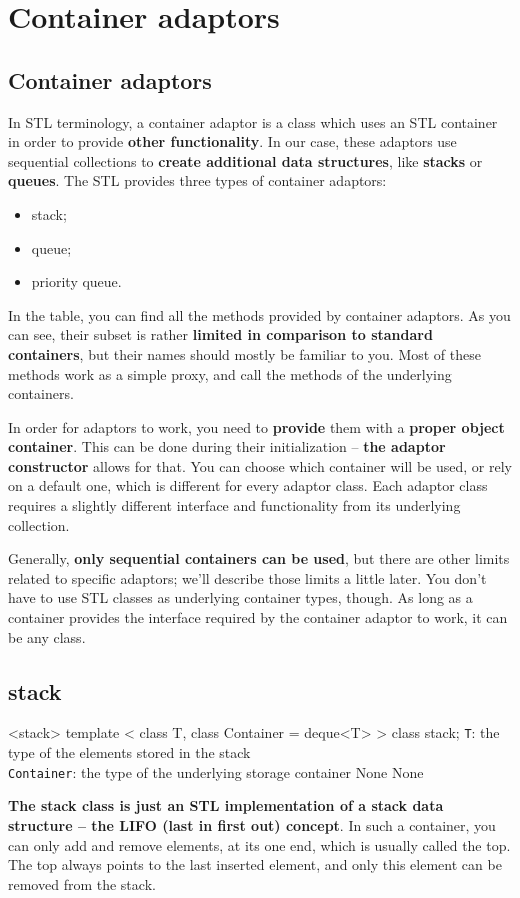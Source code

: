 %
%
\section{Container adaptors} %
\subsection{Container adaptors} %
In STL terminology, a container adaptor is a class which uses an STL container in order to provide 
\textbf{other functionality}. In our case, these adaptors use sequential collections to \textbf{create 
additional data structures}, like \textbf{stacks} or \textbf{queues}. The STL provides three types of container 
adaptors:
\begin{itemize}
    \item stack;
    \item queue;
    \item priority queue.
\end{itemize}
In the table, you can find all the methods provided by container adaptors. As you can see, their subset is 
rather \textbf{limited in comparison to standard containers}, but their names should mostly be familiar to you. 
Most of these methods work as a simple proxy, and call the methods of the underlying containers.

In order for adaptors to work, you need to \textbf{provide} them with a \textbf{proper object container}. 
This can be done during their initialization – \textbf{the adaptor constructor} allows for that. You can 
choose which container will be used, or rely on a default one, which is different for every adaptor class. 
Each adaptor class requires a slightly different interface and functionality from its underlying collection.

Generally, \textbf{only sequential containers can be used}, but there are other limits related to specific 
adaptors; we’ll describe those limits a little later. You don’t have to use STL classes as underlying container 
types, though. As long as a container provides the interface required by the container adaptor to work, it 
can be any class.

\subsection{stack} %
\begin{methodinfo}
  {<stack>}
  {template < class T, class Container = deque<T> > class stack;}
  {\texttt{T}: the type of the elements stored in the stack\\
  \texttt{Container}: the type of the underlying storage container}
  {None}
  {None}
\end{methodinfo}
\textbf{The stack class is just an STL implementation of a stack data structure – the LIFO (last in first out) 
concept}. In such a container, you can only add and remove elements, at its one end, which is usually called 
the top. The top always points to the last inserted element, and only this element can be removed from the stack.


